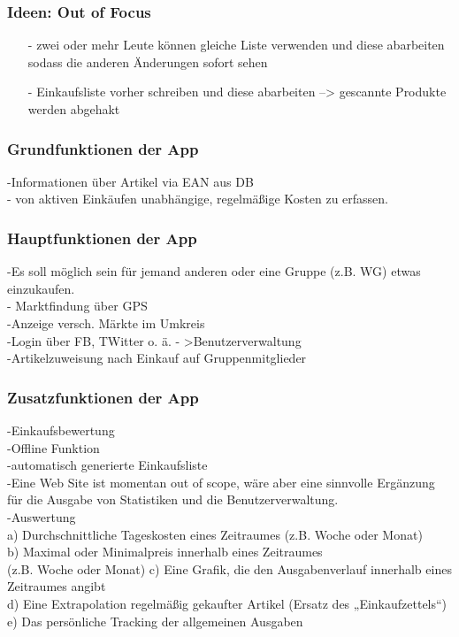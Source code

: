 \documentclass[12pt,a4paper]{article}
\begin{document}
\subsubsection*{Ideen: Out of Focus}
\begin{itemize}
\item[-] zwei oder mehr Leute können gleiche Liste verwenden und diese abarbeiten sodass die anderen Änderungen sofort sehen
\item[-] Einkaufsliste vorher schreiben und diese abarbeiten --> gescannte Produkte werden abgehakt
\end{itemize}
\subsubsection{Grundfunktionen der App}
-Informationen über Artikel via EAN aus DB \\
- von aktiven Einkäufen unabhängige, regelmäßige Kosten zu erfassen. \\

\subsubsection{Hauptfunktionen der App}

-Es soll möglich sein für jemand anderen oder eine Gruppe (z.B. WG) etwas einzukaufen. \\
- Marktfindung über GPS \\
-Anzeige versch. Märkte im Umkreis\\
-Login über FB, TWitter o. ä. - >Benutzerverwaltung\\
-Artikelzuweisung nach Einkauf auf Gruppenmitglieder\\

\subsubsection{Zusatzfunktionen der App}
-Einkaufsbewertung\\
-Offline Funktion\\
-automatisch generierte Einkaufsliste\\
-Eine Web Site ist momentan out of scope, wäre aber eine sinnvolle Ergänzung für die Ausgabe von Statistiken und die Benutzerverwaltung.\\
-Auswertung\\
 a) Durchschnittliche Tageskosten eines Zeitraumes (z.B. Woche oder Monat) \\
 b) Maximal oder Minimalpreis innerhalb eines Zeitraumes\\ (z.B. Woche oder Monat) 
 c) Eine Grafik, die den Ausgabenverlauf innerhalb eines Zeitraumes angibt \\
 d) Eine Extrapolation regelmäßig gekaufter Artikel (Ersatz des „Einkaufzettels“) \\
 e) Das persönliche Tracking der allgemeinen Ausgaben \\
\end{document}
